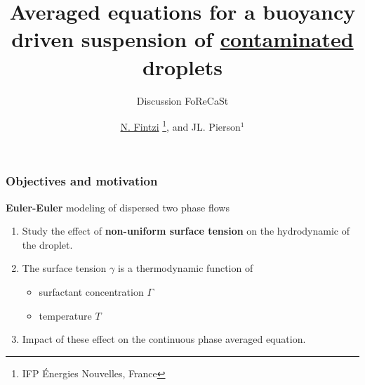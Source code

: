 \documentclass{sintefbeamer}
\title{Averaged equations for a buoyancy driven suspension of \underline{contaminated} droplets}
\subtitle{Discussion FoReCaSt}
\author{\underline{N. Fintzi} \footnote{IFP \'Energies Nouvelles, France}, and JL. Pierson$^1$}
\begin{document}
\maketitle
\section*{}

\begin{frame}
  \frametitle{Objectives and motivation}



\textbf{Euler-Euler} modeling of dispersed two phase flows 
\vfill
\begin{enumerate}
  \item Study the effect of \textbf{non-uniform surface tension} on the hydrodynamic of the droplet.
  \item The surface tension $\gamma$ is a thermodynamic function of 
  \begin{itemize}
    \item surfactant concentration $\Gamma$  
    \item temperature $T$
  \end{itemize}
  \item Impact of these effect on the continuous phase averaged equation. 
\end{enumerate}
\end{frame}
\end{document}
